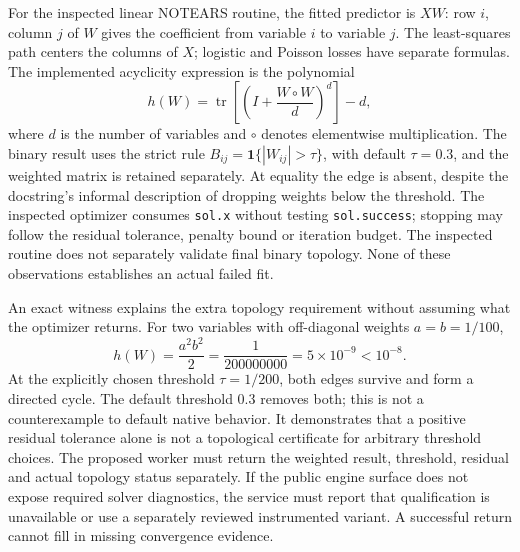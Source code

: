 For the inspected linear NOTEARS routine, the fitted predictor is $XW$:
row $i$, column $j$ of $W$ gives the coefficient from variable $i$ to variable
$j$. The least-squares path centers the columns of $X$; logistic and Poisson
losses have separate formulas. The implemented acyclicity expression is the
polynomial
\begin{equation}
 h(W)=\operatorname{tr}\!\left[\left(I+
       \frac{W\circ W}{d}\right)^d\right]-d,
 \label{exec20:gcastle-polynomial}
\end{equation}
where $d$ is the number of variables and $\circ$ denotes elementwise
multiplication. The binary result uses the strict rule
$B_{ij}=\mathbf{1}\{|W_{ij}|>\tau\}$, with default $\tau=0.3$, and the weighted
matrix is retained separately. At equality the edge is absent, despite the
docstring's informal description of dropping weights below the threshold.
The inspected optimizer consumes \texttt{sol.x} without testing
\texttt{sol.success}; stopping may follow the residual tolerance, penalty bound
or iteration budget. The inspected routine does not separately validate final
binary topology. None of these observations establishes an actual failed fit.
\citep{exec20_gcastle_source}

An exact witness explains the extra topology requirement without assuming what
the optimizer returns. For two variables with off-diagonal weights $a=b=1/100$,
\begin{equation}
 h(W)=\frac{a^2b^2}{2}=\frac{1}{200000000}=5\times10^{-9}
 <10^{-8}.
 \label{exec20:gcastle-tolerance}
\end{equation}
At the explicitly chosen threshold $\tau=1/200$, both edges survive and form a
directed cycle. The default threshold $0.3$ removes both; this is not a
counterexample to default native behavior. It demonstrates that a positive
residual tolerance alone is not a topological certificate for arbitrary
threshold choices. The proposed worker must return the weighted result,
threshold, residual and actual topology status separately. If the public engine
surface does not expose required solver diagnostics, the service must report
that qualification is unavailable or use a separately reviewed instrumented
variant. A successful return cannot fill in missing convergence evidence.
\citep{exec20_gcastle_reference}

